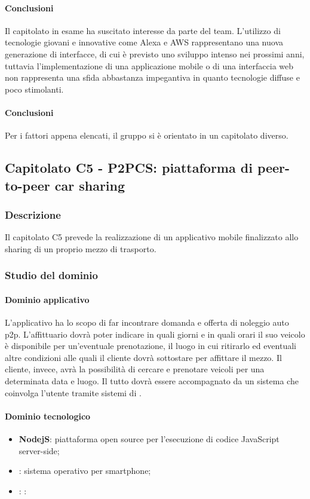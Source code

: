 	\paragraph{Conclusioni} \Spazio
	Il capitolato in esame ha suscitato interesse da parte del team. L'utilizzo di tecnologie giovani e innovative come Alexa e AWS rappresentano una nuova generazione di interfacce, di cui è previsto uno sviluppo intenso nei prossimi anni, tuttavia l'implementazione di una applicazione mobile o di una interfaccia web non rappresenta una sfida abbastanza impegantiva in quanto tecnologie diffuse e poco stimolanti.
	\paragraph{Conclusioni} 
	Per i fattori appena elencati, il gruppo si è orientato in un capitolato diverso.
	
	\subsection{Capitolato C5 - P2PCS: piattaforma di peer-to-peer car sharing}
		\subsubsection{Descrizione}
		Il capitolato C5 prevede la realizzazione di un applicativo mobile finalizzato allo sharing  di un proprio mezzo di trasporto.
		\subsubsection{Studio del dominio}
			\paragraph{Dominio applicativo} \Spazio
			L'applicativo ha lo scopo di far incontrare domanda e offerta di noleggio auto p2p. L'affittuario dovrà poter indicare in quali giorni e in quali orari il suo veicolo è disponibile per un'eventuale prenotazione, il luogo in cui ritirarlo ed eventuali altre condizioni alle quali il cliente dovrà sottostare per affittare il mezzo.
			Il cliente, invece, avrà la possibilità di cercare e prenotare veicoli per una determinata data e luogo. Il tutto dovrà essere accompagnato da un sistema che coinvolga l'utente tramite sistemi di .
			\paragraph{Dominio tecnologico} \Spazio
				\begin{itemize}
					\item  \textbf{NodejS}: piattaforma open source per l'esecuzione di codice JavaScript server-side;
					\item \textbf{}: sistema operativo per smartphone;
					\item \textbf{}: :
				\end{itemize}
